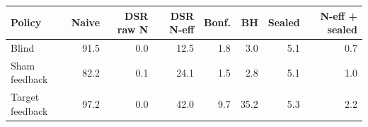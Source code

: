 \begin{tabular}{lrrrrrrr}
\toprule
Policy & Naive & DSR raw N & DSR N-eff & Bonf. & BH & Sealed & N-eff + sealed \\
\midrule
Blind & 91.5 & 0.0 & 12.5 & 1.8 & 3.0 & 5.1 & 0.7 \\
Sham feedback & 82.2 & 0.1 & 24.1 & 1.5 & 2.8 & 5.1 & 1.0 \\
Target feedback & 97.2 & 0.0 & 42.0 & 9.7 & 35.2 & 5.3 & 2.2 \\
\bottomrule
\end{tabular}
